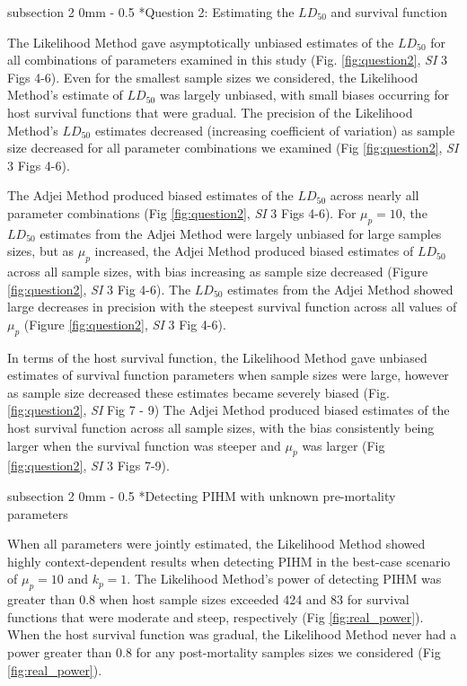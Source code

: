 \documentclass[12pt, a4paper]{article}
\makeatletter
\renewcommand{\subsection}{\@startsection
{subsection}%
{2}%
{0mm}%
{-\baselineskip}%
{0.5\baselineskip}%
{\normalfont\bf}} %
\makeatother
\begin{document}
\subsection*{Question 2: Estimating the $LD_{50}$ and survival function}

The Likelihood Method gave asymptotically unbiased estimates of the $LD_{50}$
for all combinations of parameters examined in this study (Fig. \ref{fig:question2}, \emph{SI} 3 Figs 4-6).  Even for
the smallest sample sizes we considered, the Likelihood Method's estimate of $LD_{50}$
was largely unbiased, with small biases occurring for host survival functions
that were gradual. The precision of the Likelihood Method's $LD_{50}$ estimates decreased
(increasing coefficient of variation) as sample size decreased for all
parameter combinations we examined (Fig \ref{fig:question2}, \emph{SI} 3 Figs 4-6).

The Adjei Method produced biased estimates of the $LD_{50}$ across nearly all parameter combinations (Fig \ref{fig:question2}, \emph{SI} 3 Figs 4-6).  For $\mu_p = 10$, the $LD_{50}$
estimates from the Adjei Method were largely unbiased for large samples sizes, but as $\mu_p$ increased, the Adjei Method
produced biased estimates of $LD_{50}$ across all sample sizes, with bias
increasing as sample size decreased (Figure \ref{fig:question2}, \emph{SI} 3 Fig 4-6). The $LD_{50}$ estimates from the Adjei
Method showed large decreases in precision with the steepest survival function across all values of $\mu_p$ (Figure \ref{fig:question2}, \emph{SI} 3 Fig 4-6).

In terms of the host survival function, the Likelihood Method gave unbiased estimates of survival function parameters when sample sizes were large, however as sample size decreased these estimates became severely biased (Fig. \ref{fig:question2}, \emph{SI} Fig 7 - 9) The Adjei Method produced
biased estimates of the host survival function across all sample sizes, with the bias
consistently being larger when the survival function was steeper and $\mu_p$ was larger (Fig \ref{fig:question2}, \emph{SI} 3 Figs 7-9).

\subsection*{Detecting PIHM with unknown pre-mortality parameters}

When all parameters were jointly estimated, the Likelihood Method showed highly
context-dependent results when detecting PIHM in the best-case scenario of
$\mu_p = 10$ and $k_p = 1$. The Likelihood Method's power of detecting PIHM was
greater than 0.8 when host sample sizes exceeded 424 and 83  for survival
functions that were moderate and steep, respectively (Fig
\ref{fig:real_power}).  When the host survival function was gradual, the
Likelihood Method never had a power greater than 0.8 for any post-mortality
samples sizes we considered (Fig \ref{fig:real_power}).
\end{document}
